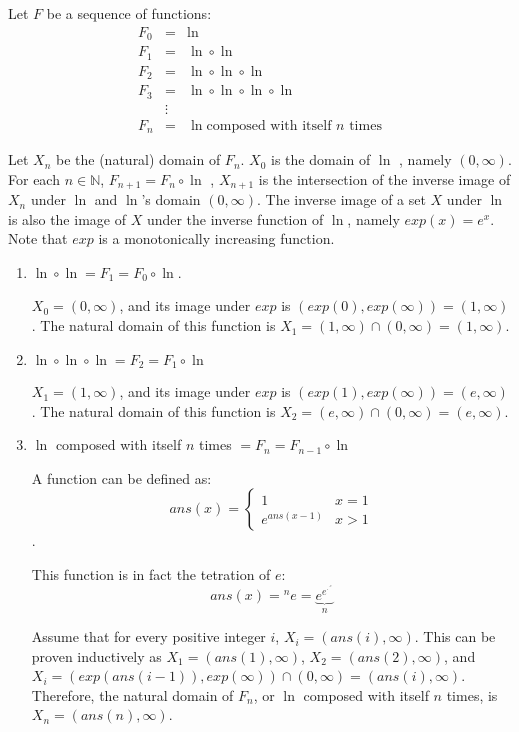 \begin{exercise}{12}
  Let $F$ be a sequence of functions:
  $$\begin{array}{rcl}
      F_0 &=& \ln \\
      F_1 &=& \ln \circ \ln \\
      F_2 &=& \ln \circ \ln \circ \ln \\
      F_3 &=& \ln \circ \ln \circ \ln \circ \ln \\
      &\vdots& \\
      F_n &=& \ln \text{composed with itself $n$ times}
    \end{array}$$

    Let $X_n$ be the (natural) domain of $F_{n}$. $X_{0}$ is the domain of $\ln$
    , namely $(0, \infty)$. For each $n \in \mathbb{N}$, $F_{n+1} = F_n \circ \ln$
    , $X_{n+1}$ is the intersection of the inverse image of $X_n$ under $\ln$
    and $\ln$'s domain $(0, \infty)$. The inverse image of a set $X$ under $\ln$
    is also the image of $X$ under the inverse function of $\ln$, namely
    $exp(x) = e^x$. Note that $exp$ is a monotonically increasing function.

  \begin{enumerate}
    \item $\ln \circ \ln = F_1 = F_0 \circ \ln$.

    $X_0 = (0, \infty)$, and its image under $exp$ is $(exp(0), exp(\infty)) = (1, \infty)$.
    The natural domain of this function is $X_1 = (1, \infty) \cap (0, \infty) = (1, \infty)$.

    \item $\ln \circ \ln \circ \ln = F_2 = F_1 \circ \ln$

    $X_1 = (1, \infty)$, and its image under $exp$ is $(exp(1), exp(\infty)) = (e, \infty)$.
    The natural domain of this function is $X_2 = (e, \infty) \cap (0, \infty) = (e, \infty)$.

    \item $\ln$ composed with itself $n$ times $= F_n = F_{n - 1} \circ \ln$

    A function  can be defined as:
    $$ans(x) = \left\{
    \begin{array}{lc}
    1            & x = 1 \\
    e^{ans(x-1)} & x > 1
    \end{array}
    \right.$$.

    This function is in fact the tetration of $e$:
    $$ans(x) = {^{n}e} = \underbrace{e^{e^{\cdot^{\cdot^{e}}}}}_n$$

    Assume that for every positive integer $i$, $X_i = (ans(i), \infty)$. This
    can be proven inductively as $X_1 = (ans(1), \infty)$, $X_2 = (ans(2), \infty)$,
    and $X_i = (exp(ans(i-1)), exp(\infty)) \cap (0, \infty) = (ans(i), \infty)$.
    Therefore, the natural domain of $F_n$, or $\ln$ composed with itself $n$ times,
    is $X_n = (ans(n), \infty)$.
  \end{enumerate}
\end{exercise}
